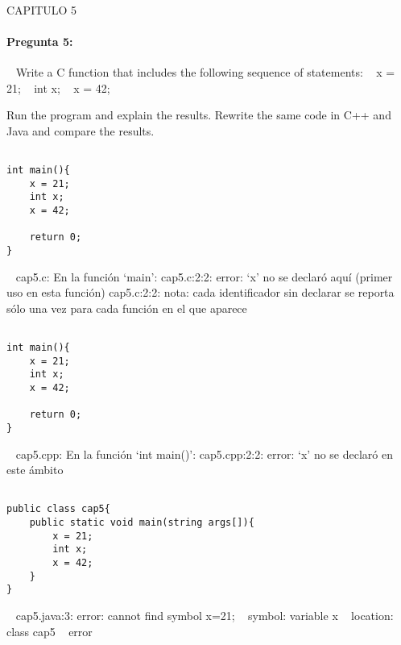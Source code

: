 \documentclass[../main.tex]{subfiles}
\begin{document}
\paragraph{ }CAPITULO 5
\paragraph{Pregunta 5:}
~\newline
	Write a C function that includes the following sequence of statements:
~\newline
	x = 21;
~\newline
	int x;
~\newline
	x = 42;
	
	Run the program and explain the results. Rewrite the same code in C++
	and Java and compare the results.

\begin{lstlisting}[belowcaptionskip=.5em,caption={C\'odigo en lenguaje C.}]
	
int main(){
	x = 21;
	int x;
	x = 42;
	
	return 0;
}
\end{lstlisting}
~\newline
cap5.c: En la función ‘main’:\newline
cap5.c:2:2: error: ‘x’ no se declaró aquí (primer uso en esta función)\newline
cap5.c:2:2: nota: cada identificador sin declarar se reporta sólo una vez para cada función en el que aparece\newline

\begin{lstlisting}[belowcaptionskip=.5em,caption={C\'odigo en lenguaje C++.}]
	
int main(){
	x = 21;
	int x;
	x = 42;
	
	return 0;
}
\end{lstlisting}
~\newline
cap5.cpp: En la función ‘int main()’:\newline
cap5.cpp:2:2: error: ‘x’ no se declaró en este ámbito\newline

\begin{lstlisting}[belowcaptionskip=.5em,caption={C\'odigo en lenguaje Java.}]
	
public class cap5{
	public static void main(string args[]){
		x = 21;
		int x;
		x = 42;
	}
}
\end{lstlisting}
~\newline
cap5.java:3: error: cannot find symbol x=21;
~\newline
  symbol:   variable x
~\newline
  location: class cap5
~ error
\clearpage
\end{document}
